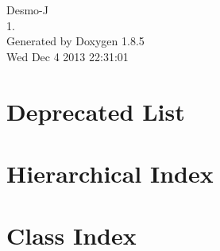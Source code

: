 \documentclass[twoside]{book}
\newcommand{\clearemptydoublepage}{%
  \newpage{\pagestyle{empty}\cleardoublepage}%
}
\begin{document}
\begin{titlepage}
\vspace*{7cm}
\begin{center}%
{\Large Desmo-\/\-J \\[1ex]\large 1. }\\
\vspace*{1cm}
{\large Generated by Doxygen 1.8.5}\\
\vspace*{0.5cm}
{\small Wed Dec 4 2013 22:31:01}\\
\end{center}
\end{titlepage}
\clearemptydoublepage
\tableofcontents
\clearemptydoublepage
{}

\chapter{Deprecated List}
\label{deprecated}

\chapter{Hierarchical Index}

\chapter{Class Index}

\end{document}
